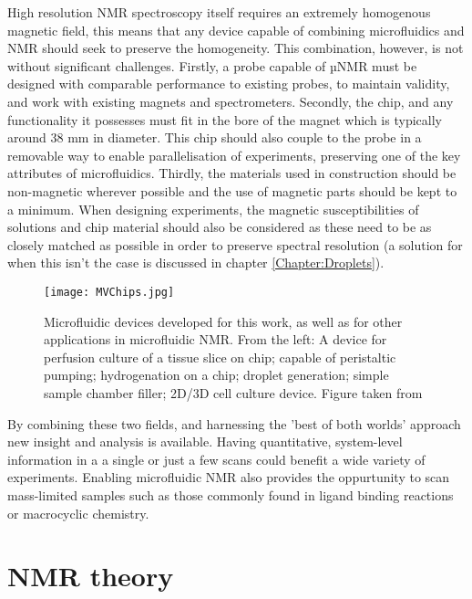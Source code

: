 High resolution NMR spectroscopy itself requires an extremely homogenous magnetic field, this means that
any device capable of combining microfluidics and NMR should seek to preserve the homogeneity. This combination, however, is not without significant challenges. Firstly, a probe capable of µNMR must
be designed with comparable performance to existing probes, to maintain validity, and work with existing
magnets and spectrometers. Secondly, the chip, and any functionality it possesses must fit in the bore of
the magnet which is typically around 38 mm in diameter. This chip should also couple to the probe in a
removable way to enable parallelisation of experiments, preserving one of the key attributes of microfluidics.
Thirdly, the materials used in construction should be non-magnetic wherever possible and the use of magnetic
parts should be kept to a minimum. When designing experiments, the magnetic susceptibilities of solutions and
chip material should also be considered as these need to be as closely matched as possible in order to preserve
spectral resolution (a solution for when this isn’t the case is discussed in chapter \ref{Chapter:Droplets}).


\begin{figure}
  \begin{center}
  \texttt{[image: MVChips.jpg]}
  \end{center}
  \caption{Microfluidic devices developed for this work, as well as for other applications in microfluidic
  NMR. From the left: A device for perfusion culture of a tissue slice on chip; capable of peristaltic
  pumping; hydrogenation on a chip; droplet generation; simple sample chamber filler; 2D/3D cell culture
  device. Figure taken from \citep{RN164}}
  \label{fig:DifferentChips}
\end{figure}

By combining these two fields, and harnessing the 'best of both worlds' approach
new insight and analysis is available. Having quantitative, system-level information in a
a single or just a few scans could benefit a wide variety of experiments. Enabling microfluidic
NMR also provides the oppurtunity to scan mass-limited samples such as those commonly found in
ligand binding reactions\citep{Finch:2016gv} or macrocyclic chemistry\citep{RN81}.

\newpage

\section{NMR theory}

